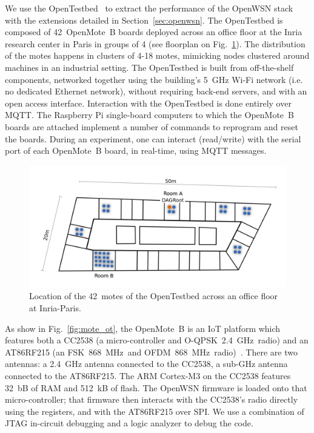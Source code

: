 \documentclass[sensors,article,submit,moreauthors,pdftex]{Definitions/mdpi}
\newcommand{\fsk}           {FSK~868~MHz}
\newcommand{\oqpsk}         {O-QPSK~2.4~GHz}
\newcommand{\ofdm}          {OFDM~868~MHz}
\newcommand{\figwidth}      {0.80}
\begin{document}
We use the OpenTestbed~\cite{munoz19opentestbed} to extract the performance of the OpenWSN stack with the extensions detailed in Section~\ref{sec:openwsn}.
The OpenTestbed is composed of 42~OpenMote~B boards deployed across an office floor at the Inria research center in Paris in groups of 4 (see floorplan on Fig.~\ref{fig:building_motes}).
The distribution of the motes happens in clusters of 4-18 motes, mimicking nodes clustered around machines in an industrial setting.
The OpenTestbed is built from off-the-shelf components,
    networked together using the building's 5~GHz Wi-Fi network (i.e. no dedicated Ethernet network),
    without requiring back-end servers, and
    with an open access interface.
Interaction with the OpenTestbed is done entirely over MQTT.
The Raspberry Pi single-board computers to which the OpenMote~B boards are attached implement a number of commands to reprogram and reset the boards.
During an experiment, one can interact (read/write) with the serial port of each OpenMote~B board, in real-time, using MQTT messages.

\begin{figure}
	\centering
	\includegraphics[width=\figwidth\columnwidth]{building_motes}
	\caption{Location of the 42~motes of the OpenTestbed across an office floor at Inria-Paris.}
    \label{fig:building_motes}
\end{figure}


As show in Fig.~\ref{fig:mote_ot}, the OpenMote~B is an IoT platform which features both
    a CC2538 (a micro-controller and \oqpsk\ radio) and
    an AT86RF215 (an \fsk\ and \ofdm\  radio)~\cite{tuset16openmote}.
There are two antennas:
    a 2.4~GHz antenna connected to the CC2538,
    a sub-GHz antenna connected to the AT86RF215.
The ARM Cortex-M3 on the CC2538 features 32~bB of RAM and 512~kB of flash.
The OpenWSN firmware is loaded onto that micro-controller;
    that firmware then interacts with the CC2538's radio directly using the registers,
    and with the AT86RF215 over SPI.
We use a combination of JTAG in-circuit debugging and a logic analyzer to debug the code.
\end{document}
